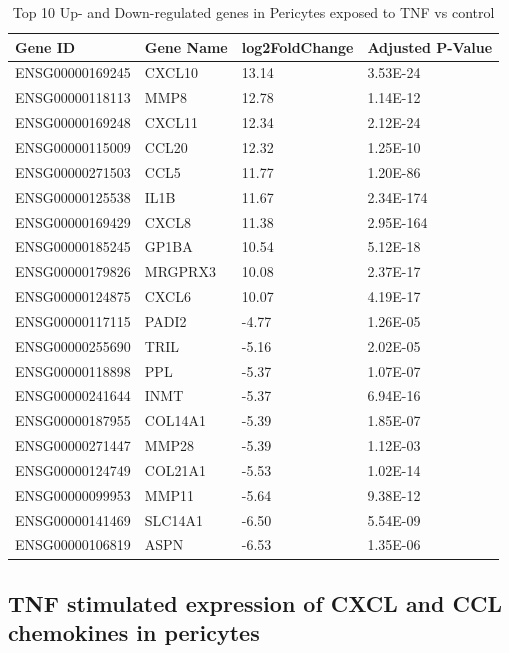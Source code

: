 \begin{table}[h!t]
    \footnotesize
    \label{table:genesperi}
	\centering
	\begin{tabular}{|ll|ll|}
		\hline
		Gene ID & Gene Name & log2FoldChange &Adjusted P-Value \\ \hline

		\hline
		ENSG00000169245 & CXCL10  & 13.14 & 3.53E-24 \\
		ENSG00000118113 & MMP8    & 12.78 & 1.14E-12 \\
		ENSG00000169248 & CXCL11  & 12.34 & 2.12E-24 \\
		ENSG00000115009 & CCL20   & 12.32 & 1.25E-10 \\
		ENSG00000271503 & CCL5    & 11.77 & 1.20E-86 \\
		ENSG00000125538 & IL1B    & 11.67 & 2.34E-174 \\
		ENSG00000169429 & CXCL8   & 11.38 & 2.95E-164 \\
		ENSG00000185245 & GP1BA   & 10.54 & 5.12E-18 \\
		ENSG00000179826 & MRGPRX3 & 10.08 & 2.37E-17 \\
		ENSG00000124875 & CXCL6   & 10.07 & 4.19E-17 \\
		ENSG00000117115 & PADI2   & -4.77 & 1.26E-05 \\
		ENSG00000255690 & TRIL    & -5.16 & 2.02E-05 \\
		ENSG00000118898 & PPL     & -5.37 & 1.07E-07 \\
		ENSG00000241644 & INMT    & -5.37 & 6.94E-16 \\
		ENSG00000187955 & COL14A1 & -5.39 & 1.85E-07 \\
		ENSG00000271447 & MMP28   & -5.39 & 1.12E-03 \\
		ENSG00000124749 & COL21A1 & -5.53 & 1.02E-14 \\
		ENSG00000099953 & MMP11   & -5.64 & 9.38E-12 \\
		ENSG00000141469 & SLC14A1 & -6.50 & 5.54E-09 \\
		ENSG00000106819 & ASPN    & -6.53 & 1.35E-06 \\\hline
	\end{tabular}
    \caption{Top 10 Up- and Down-regulated genes in Pericytes exposed to TNF vs control}
\end{table}

\subsection*{TNF stimulated expression of CXCL and CCL chemokines in pericytes}

